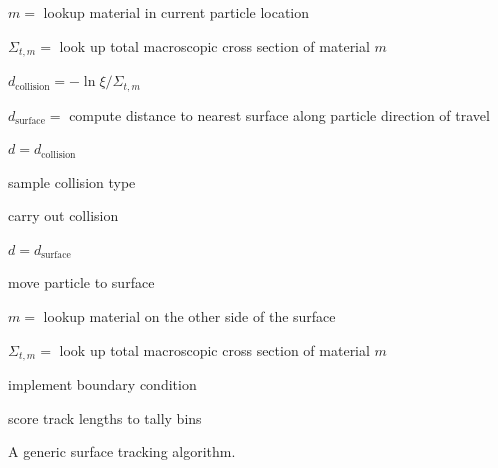 \begin{algorithm}
\begin{algorithmic}[1]

    \State $m =$ lookup material in current particle location

    \State $\Sigma_{t,m} =$ look up total macroscopic cross section of material $m$ 

    
        \State $d_{\text{collision}} = -\ln{\xi} / \Sigma_{t,m} $
        
        \State $d_{\text{surface}} =$ compute distance to nearest surface along particle direction of travel


                \State $d = d_{\text{collision}}$
                
                \State sample collision type
                
                \State carry out collision
                
             \Else 

                \State $d = d_{\text{surface}}$
        
                \State move particle to surface
    
                \State $m =$ lookup material on the other side of the surface
    
                \State $\Sigma_{t,m} =$ look up total macroscopic cross section of material $m$ 
    
    
                    \State implement boundary condition
    
            \EndIf
        \EndIf
        s\State core track lengths to tally bins
    \EndWhile
    
    \vspace{1.5em}
    \caption{A generic surface tracking algorithm.}
    \label{alg:surface}
\end{algorithmic}
\end{algorithm}


